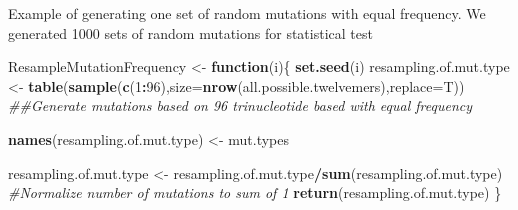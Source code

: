\documentclass[
]{article}
\newenvironment{Shaded}{\begin{snugshade}}{\end{snugshade}}
\newcommand{\CommentTok}[1]{\textcolor[rgb]{0.56,0.35,0.01}{\textit{#1}}}
\newcommand{\ControlFlowTok}[1]{\textcolor[rgb]{0.13,0.29,0.53}{\textbf{#1}}}
\newcommand{\DataTypeTok}[1]{\textcolor[rgb]{0.13,0.29,0.53}{#1}}
\newcommand{\DecValTok}[1]{\textcolor[rgb]{0.00,0.00,0.81}{#1}}
\newcommand{\KeywordTok}[1]{\textcolor[rgb]{0.13,0.29,0.53}{\textbf{#1}}}
\newcommand{\NormalTok}[1]{#1}
\newcommand{\OperatorTok}[1]{\textcolor[rgb]{0.81,0.36,0.00}{\textbf{#1}}}
\newcommand{\StringTok}[1]{\textcolor[rgb]{0.31,0.60,0.02}{#1}}
\begin{document}
\begin{Shaded}
\end{Shaded}

Example of generating one set of random mutations with equal frequency.
We generated 1000 sets of random mutations for statistical test

\begin{Shaded}
\begin{Highlighting}[]
\NormalTok{ResampleMutationFrequency <-}\StringTok{ }\ControlFlowTok{function}\NormalTok{(i)\{}
  \KeywordTok{set.seed}\NormalTok{(i)}
\NormalTok{  resampling.of.mut.type <-}\StringTok{ }\KeywordTok{table}\NormalTok{(}\KeywordTok{sample}\NormalTok{(}\KeywordTok{c}\NormalTok{(}\DecValTok{1}\OperatorTok{:}\DecValTok{96}\NormalTok{),}\DataTypeTok{size=}\KeywordTok{nrow}\NormalTok{(all.possible.twelvemers),}\DataTypeTok{replace=}\NormalTok{T)) }\CommentTok{##Generate mutations based on 96 trinucleotide based with equal frequency}
  
  \KeywordTok{names}\NormalTok{(resampling.of.mut.type) <-}\StringTok{ }\NormalTok{mut.types}
  
\NormalTok{  resampling.of.mut.type <-}\StringTok{ }\NormalTok{resampling.of.mut.type}\OperatorTok{/}\KeywordTok{sum}\NormalTok{(resampling.of.mut.type) }\CommentTok{#Normalize number of mutations to sum of 1}
  \KeywordTok{return}\NormalTok{(resampling.of.mut.type)}
\NormalTok{\}}
\end{Highlighting}
\end{Shaded}
\end{document}

